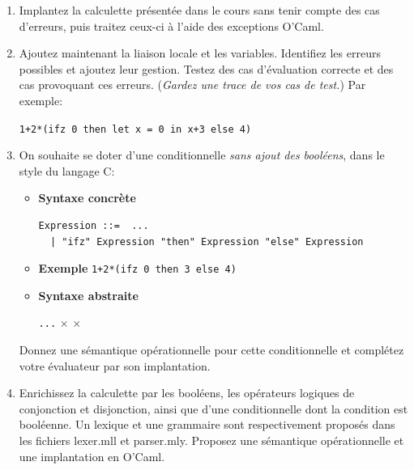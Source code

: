 
\begin{enumerate}

  \item \label{q\theenumi} Implantez la calculette présentée dans le
  cours sans tenir compte des cas d'erreurs, puis traitez ceux-ci à
  l'aide des exceptions O'Caml.

  \item \label{q\theenumi} Ajoutez maintenant la liaison locale et les
  variables. Identifiez les erreurs possibles et ajoutez leur
  gestion. Testez des cas d'évaluation correcte et des cas provoquant
  ces erreurs. (\emph{Gardez une trace de vos cas de test.}) Par
  exemple:

  \begin{center}
  \texttt{1+2*(ifz 0 then let x = 0 in x+3 else 4)}
  \end{center}

  \item \label{q\theenumi} On souhaite se doter d'une conditionnelle
  \emph{sans ajout des booléens}, dans le style du langage C:

  \begin{itemize}

    \item[$\bullet$] \textbf{Syntaxe concrète}
  {\small
   \begin{verbatim}
Expression ::=  ...
  | "ifz" Expression "then" Expression "else" Expression
   \end{verbatim}
  }

  \vspace*{-6pt}

  \item[$\bullet$] \textbf{Exemple} \qquad \texttt{1+2*(ifz 0 then 3
  else 4)}

  \item[$\bullet$] \textbf{Syntaxe abstraite}

  \Xtype{}  \equal{} \texttt{...} \vbar{} 
  \Xof{}  $\times$  $\times$ \semi

  \end{itemize}

  Donnez une sémantique opérationnelle pour cette conditionnelle et
  complétez votre évaluateur par son implantation.

  \item \label{q\theenumi} Enrichissez la calculette par les booléens,
  les opérateurs logiques de conjonction et disjonction, ainsi que
  d'une conditionnelle dont la condition est booléenne. Un lexique et
  une grammaire sont respectivement proposés dans les fichiers
  \textsf{lexer.mll} et \textsf{parser.mly}. Proposez une sémantique
  opérationnelle et une implantation en O'Caml.


\end{enumerate}
